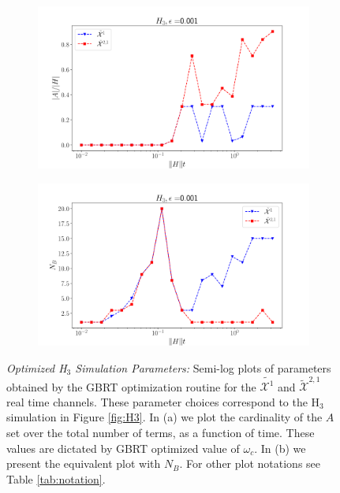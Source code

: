 \begin{figure}[h!] 
    \centering
        \begin{subfigure}[b]{.49\textwidth}
            \includegraphics[width=1\textwidth]{composite_numerics/H3_w.png}
            \caption{}
        \end{subfigure}
        \begin{subfigure}[b]{.49\textwidth}
            \includegraphics[width=1\textwidth]{composite_numerics/H3_nb.png}
            \caption{}
        \end{subfigure}
        \caption{\textit{Optimized H$_3$ Simulation Parameters:} Semi-log plots of parameters obtained by the GBRT optimization routine for the $\widetilde{\mathcal{X}^{1}}$ and $\widetilde{\mathcal{X}}^{2,1}$ real time channels. These parameter choices correspond to the H$_3$ simulation in Figure \ref{fig:H3}. In (a) we plot the cardinality of the $A$ set over the total number of terms, as a function of time. These values are dictated by GBRT optimized value of $\omega_c$. In (b) we present the equivalent plot with $N_B$. For other plot notations see Table \ref{tab:notation}.} 
        \label{fig:H3nbW}
\end{figure}
\FloatBarrier

